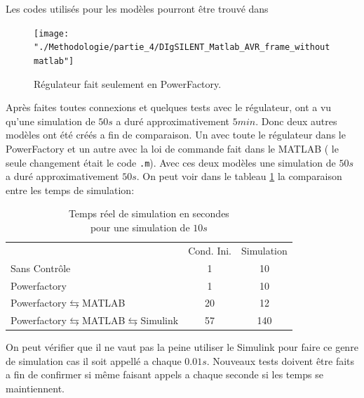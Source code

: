 Les codes utilisés pour les modèles pourront être trouvé dans 

\begin{figure}[H]
	\begin{center}	
		\texttt{[image: "./Methodologie/partie\_4/DIgSILENT\_Matlab\_AVR\_frame\_withoutmatlab"]}
		\caption{Régulateur fait seulement en PowerFactory.}
		\label{fig:DIgSILENT_Matlab_AVR_frame_withoutmatlab}
	\end{center}
\end{figure}

Après faites toutes connexions et quelques tests avec le régulateur, ont a vu qu'une simulation de $ 50s $ a duré approximativement $ 5min $. Donc deux autres modèles ont été créés a fin de comparaison. Un avec toute le régulateur dans le PowerFactory et un autre avec la loi de commande fait dans le MATLAB ( le seule changement était le code \verb|.m|). Avec ces deux modèles une simulation de $50s$ a duré approximativement $ 50s $.
On peut voir dans le tableau \ref{tab:comparaisontempssimul} la comparaison entre les temps de simulation:

\begin{table}[H]
	\centering
	\captionsetup{justification=centering,margin=2cm}
	\caption{Temps réel de simulation en secondes\\ pour une simulation de $ 10s $}
	\label{tab:comparaisontempssimul}
	\begin{tabular}{lcc}
		&Cond. Ini.&Simulation\\
		Sans Contrôle&1&10\\
		Powerfactory&1&10\\
		Powerfactory$ \leftrightarrows $MATLAB&20&12\\
		Powerfactory$ \leftrightarrows $MATLAB$ \leftrightarrows $Simulink&57&140\\
	\end{tabular}
\end{table}
On peut vérifier que il ne vaut pas la peine utiliser le Simulink pour faire ce genre de simulation cas il soit appellé  a chaque $ 0.01s $. Nouveaux tests doivent être faits a fin de confirmer si même faisant appels a chaque seconde si les temps se maintiennent.



